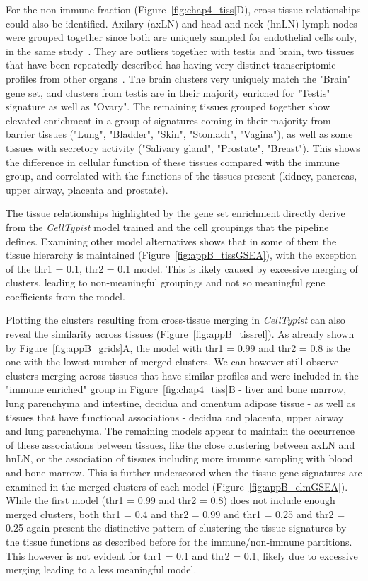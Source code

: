 For the non-immune fraction (Figure~\ref{fig:chap4_tiss}D), cross tissue relationships could also be identified. Axilary (axLN) and head and neck (hnLN) lymph nodes were grouped together since both are uniquely sampled for endothelial cells only, in the same study~\citep{takeda_single-cell_2019}. They are outliers together with testis and brain, two tissues that have been repeatedly described has having very distinct transcriptomic profiles from other organs~\cite{brawand_evolution_2011,barbosa-morais_evolutionary_2012}. The brain clusters very uniquely match the "Brain" gene set, and clusters from testis are in their majority enriched for "Testis" signature as well as "Ovary". The remaining tissues grouped together show elevated enrichment in a group of signatures coming in their majority from barrier tissues ("Lung", "Bladder", "Skin", "Stomach", "Vagina"), as well as some tissues with secretory activity ("Salivary gland", "Prostate", "Breast"). This shows the difference in cellular function of these tissues compared with the immune group, and correlated with the functions of the tissues present (kidney, pancreas, upper airway, placenta and prostate).

The tissue relationships highlighted by the gene set enrichment directly derive from the \textit{CellTypist} model trained and the cell groupings that the pipeline defines. Examining other model alternatives shows that in some of them the tissue hierarchy is maintained (Figure~\ref{fig:appB_tissGSEA}), with the exception of the thr1 = 0.1, thr2 = 0.1 model. This is likely caused by excessive merging of clusters, leading to non-meaningful groupings and not so meaningful gene coefficients from the model.

Plotting the clusters resulting from cross-tissue merging in \textit{CellTypist} can also reveal the similarity across tissues (Figure~\ref{fig:appB_tissrel}). As already shown by Figure~\ref{fig:appB_grids}A, the model with thr1 = 0.99 and thr2 = 0.8 is the one with the lowest number of merged clusters. We can however still observe clusters merging across tissues that have similar profiles and were included in the "immune enriched" group in Figure~\ref{fig:chap4_tiss}B - liver and bone marrow, lung parenchyma and intestine, decidua and omentum adipose tissue - as well as tissues that have functional associations - decidua and placenta, upper airway and lung parenchyma. The remaining models appear to maintain the occurrence of these associations between tissues, like the close clustering between axLN and hnLN, or the association of tissues including more immune sampling with blood and bone marrow. This is further underscored when the tissue gene signatures are examined in the merged clusters of each model (Figure~\ref{fig:appB_clmGSEA}). While the first model (thr1 = 0.99 and thr2 = 0.8) does not include enough merged clusters, both thr1 = 0.4 and thr2 = 0.99 and thr1 = 0.25 and thr2 = 0.25 again present the distinctive pattern of clustering the tissue signatures by the tissue functions as described before for the immune/non-immune partitions. This however is not evident for thr1 = 0.1 and thr2 = 0.1, likely due to excessive merging leading to a less meaningful model.

